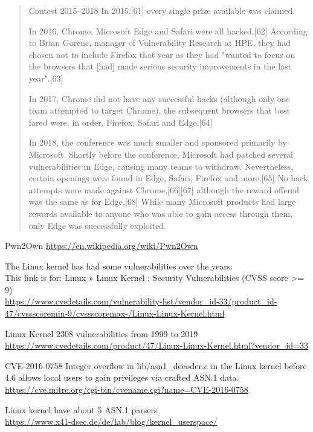 \documentclass[Screen16to9,17pt]{foils}
\begin{document}
\begin{quote}
Contest 2015–2018
In 2015,[61] every single prize available was claimed.

In 2016, Chrome, Microsoft Edge and Safari were all hacked.[62] According to Brian Gorenc, manager of Vulnerability Research at HPE, they had chosen not to include Firefox that year as they had "wanted to focus on the browsers that [had] made serious security improvements in the last year".[63]

In 2017, Chrome did not have any successful hacks (although only one team attempted to target Chrome), the subsequent browsers that best fared were, in order, Firefox, Safari and Edge.[64]

In 2018, the conference was much smaller and sponsored primarily by Microsoft. Shortly before the conference, Microsoft had patched several vulnerabilities in Edge, causing many teams to withdraw. Nevertheless, certain openings were found in Edge, Safari, Firefox and more.[65] No hack attempts were made against Chrome,[66][67] although the reward offered was the same as for Edge.[68] While many Microsoft products had large rewards available to anyone who was able to gain access through them, only Edge was successfully exploited.
\end{quote}

Pwn2Own
\url{https://en.wikipedia.org/wiki/Pwn2Own}



The Linux kernel has had some vulnerabilities over the years:\\
This link is for: Linux » Linux Kernel : Security Vulnerabilities (CVSS score >= 9)\\

{\footnotesize\url{https://www.cvedetails.com/vulnerability-list/vendor_id-33/product_id-47/cvssscoremin-9/cvssscoremax-/Linux-Linux-Kernel.html}}

Linux Kernel 2308 vulnerabilities from 1999 to 2019\\
\url{https://www.cvedetails.com/product/47/Linux-Linux-Kernel.html?vendor_id=33}


\begin{list2}
\item CVE-2016-0758 Integer overflow in lib/asn1\_decoder.c in the Linux kernel before 4.6 allows local users to gain privileges via crafted ASN.1 data.\\
\url{https://cve.mitre.org/cgi-bin/cvename.cgi?name=CVE-2016-0758}
\item Linux kernel have about 5 ASN.1 parsers\\
\url{https://www.x41-dsec.de/de/lab/blog/kernel_userspace/}
\end{list2}
\end{document}
